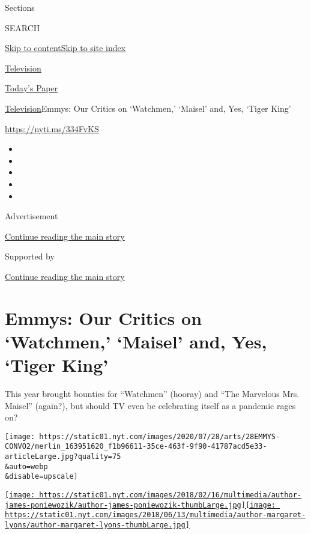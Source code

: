 Sections

SEARCH

\protect\hyperlink{site-content}{Skip to
content}\protect\hyperlink{site-index}{Skip to site index}

\href{https://www.nytimes.com/section/arts/television}{Television}

\href{https://myaccount.nytimes.com/auth/login?response_type=cookie\&client_id=vi}{}

\href{https://www.nytimes.com/section/todayspaper}{Today's Paper}

\href{/section/arts/television}{Television}\textbar{}Emmys: Our Critics
on `Watchmen,' `Maisel' and, Yes, `Tiger King'

\url{https://nyti.ms/334FvKS}

\begin{itemize}
\item
\item
\item
\item
\item
\end{itemize}

Advertisement

\protect\hyperlink{after-top}{Continue reading the main story}

Supported by

\protect\hyperlink{after-sponsor}{Continue reading the main story}

\hypertarget{emmys-our-critics-on-watchmen-maisel-and-yes-tiger-king}{%
\section{Emmys: Our Critics on `Watchmen,' `Maisel' and, Yes, `Tiger
King'}\label{emmys-our-critics-on-watchmen-maisel-and-yes-tiger-king}}

This year brought bounties for ``Watchmen'' (hooray) and ``The Marvelous
Mrs. Maisel'' (again?), but should TV even be celebrating itself as a
pandemic rages on?

\texttt{[image: https://static01.nyt.com/images/2020/07/28/arts/28EMMYS-CONVO2/merlin\_163951620\_f1b96611-35ce-463f-9f90-41787acd5e33-articleLarge.jpg?quality=75\\\&auto=webp\\\&disable=upscale]}

\href{https://www.nytimes.com/by/james-poniewozik}{\texttt{[image: https://static01.nyt.com/images/2018/02/16/multimedia/author-james-poniewozik/author-james-poniewozik-thumbLarge.jpg]}}\href{https://www.nytimes.com/by/margaret-lyons}{\texttt{[image: https://static01.nyt.com/images/2018/06/13/multimedia/author-margaret-lyons/author-margaret-lyons-thumbLarge.jpg]}}

